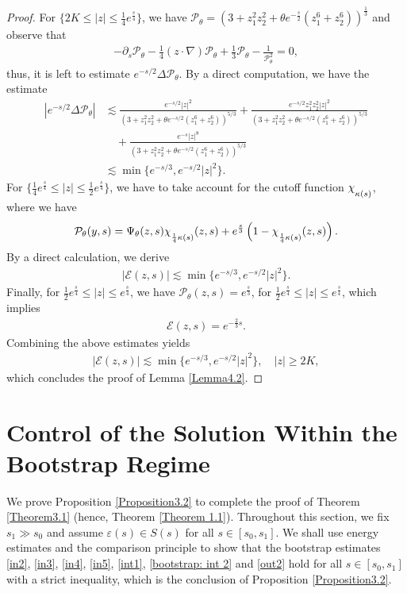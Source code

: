 \documentclass[11pt,reqno]{amsart}
\theoremstyle{definition}
\theoremstyle{bfremark}
\numberwithin{equation}{section}
\newcommand{\mchi}{\raisebox{0pt}[1ex][1ex]{$\chi$}}
\begin{document}
\begin{proof}
For \(\{2K \leq |z| \leq \frac{1}{4}e^{\frac{s}{4}}\}\), we have \(\mathcal{P}_{\theta}=(3+z_1^2z_2^2+\theta e^{-\frac{s}{2}}(z_1^6+z_2^6))^{\frac{1}{3}}\) and observe that
\begin{align*}
    -\partial_s\mathcal{P}_{\theta}-\frac{1}{4}(z \cdot \nabla)\mathcal{P}_{\theta}+\frac{1}{3}\mathcal{P}_{\theta}-\frac{1}{\mathcal{P}_{\theta}^2}=0,
\end{align*}
thus, it is left to estimate \(e^{-s/2} \Delta \mathcal{P}_{\theta}\). By a direct computation, we have the estimate
\begin{align*}
    |e^{-s/2}\Delta \mathcal{P}_{\theta}|& \lesssim \frac{e^{-s/2}|z|^2}{(3+z_1^2z_2^2+\theta e^{-s/2}(z_1^6+z_2^6))^{5/3}}+\frac{e^{-s/2}z_1^2z_2^2|z|^2}{(3+z_1^2z_2^2+\theta e^{-s/2}(z_1^6+z_2^6))^{5/3}}\\
    &\quad +\frac{e^ {-s}|z|^8}{(3+z_1^2z_2^2+\theta e^{-s/2}(z_1^6+z_2^6))^{5/3}}\\
    & \lesssim \min{\{e^{-s/3},e^{-s/2}|z|^2\}}.
\end{align*}
For \(\{\frac{1}{4}e^{\frac{s}{4}} \leq |z| \leq \frac{1}{2}e^{\frac{s}{4}}\}\), we have to take account for the cutoff function \(\mchi_{\kappa(s)}\), where we have
\begin{align*}
    \mathcal{P}_{\theta}(y,s) = \Psi_{\theta}(z,s)\mchi_{\frac{1}{4}\kappa(s)}(z,s)+e^{\frac{s}{3}}\left(1-\mchi_{\frac{1}{4}\kappa(s)}(z,s)\right).
\end{align*}
By a direct calculation, we derive
\begin{align*}
    |\mathcal{E}(z,s)| \lesssim \min{\{e^{-s/3},e^{-s/2}|z|^2\}}.
\end{align*}
Finally, for \(\frac{1}{2}e^{\frac{s}{4}} \leq |z| \leq e^{\frac{s}{4}}\), we have \(\mathcal{P}_{\theta}(z,s)=e^{\frac{s}{3}}\), for \(\frac{1}{2}e^{\frac{s}{4}} \leq |z| \leq e^{\frac{s}{4}}\), which implies
\begin{align*}
    \mathcal{E}(z,s)=e^{-\frac{2}{3}s}.
\end{align*}
Combining the above estimates yields
\begin{align*}
    |\mathcal{E}(z,s)| \lesssim \min{\{e^{-s/3},e^{-s/2}|z|^2\}}, \quad |z| \geq 2K,
\end{align*}
which concludes the proof of Lemma \ref{Lemma4.2}.
\end{proof}

\vspace{10pt}

\section{Control of the Solution Within the Bootstrap Regime}
\label{section5}
We prove Proposition \ref{Proposition3.2} to complete the proof of Theorem \ref{Theorem3.1} (hence, Theorem \ref{Theorem 1.1}). Throughout this section, we fix \(s_1 \gg s_0\) and assume \(\varepsilon(s) \in S(s)\) for all \(s \in [s_0,s_1]\). We shall use energy estimates and the comparison principle to show that the bootstrap estimates \ref{in2}, \ref{in3}, \ref{in4}, \ref{in5}, \ref{int1}, \ref{bootstrap: int 2} and \ref{out2} hold for all \(s \in [s_0,s_1]\) with a strict inequality, which is the conclusion of Proposition \ref{Proposition3.2}.
\end{document}

